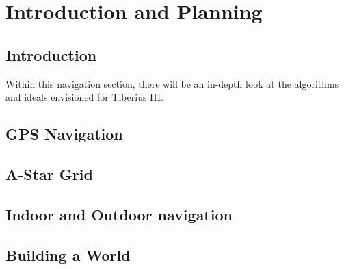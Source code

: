 \section{Introduction and Planning}

\subsection{Introduction}
Within this navigation section, there will be an in-depth look at the algorithms and ideals envisioned for Tiberius III. 
\subsection{GPS Navigation}

\subsection{A-Star Grid}

\subsection{Indoor and Outdoor navigation}

\subsection{Building a World}